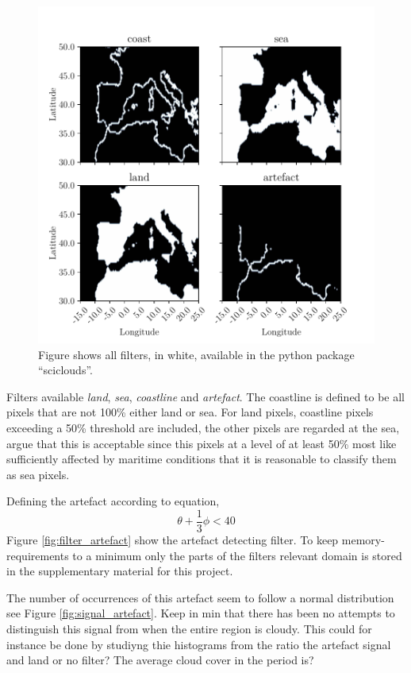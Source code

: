 \begin{figure}
    \centering
    \includegraphics{python_figs/filters.pdf}
    \caption{Figure shows all filters, in white, available in the python package ``sciclouds''.}
    \label{fig:filters_subplot}
\end{figure}


Filters available \textit{land}, \textit{sea}, \textit{coastline} and \textit{artefact}. The coastline is defined to be all pixels that are not 100\% either land or sea. For land pixels, coastline pixels exceeding a 50\% threshold are included, the other pixels are regarded at the sea, argue that this is acceptable since this pixels at a level of at least 50\% most like sufficiently affected by maritime conditions that it is reasonable to classify them as sea pixels.

Defining the artefact according to equation, 
\begin{equation} \label{eq:artefact_condition}
    \theta + \frac{1}{3}\phi < 40
\end{equation}
Figure \ref{fig:filter_artefact} show the artefact detecting filter. To keep memory-requirements to a minimum only the parts of the filters relevant domain is stored in the supplementary material for this project.

The number of occurrences of this artefact seem to follow a normal distribution see Figure \ref{fig:signal_artefact}. Keep in min that there has been no attempts to distinguish this signal from when the entire region is cloudy. This could for instance be done by studiyng thie histograms from the ratio the artefact signal and land or no filter? The average cloud cover in the period is? 

